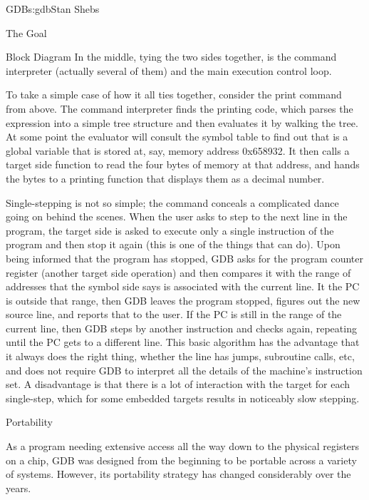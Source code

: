 \begin{aosachapter}{GDB}{s:gdb}{Stan Shebs}
\begin{aosasect1}{The Goal}
\begin{aosasect1}{Block Diagram}
In the middle, tying the two sides together, is the command
interpreter (actually several of them) and the main execution control
loop.

To take a simple case of how it all ties together, consider the print
command from above.  The command interpreter finds the printing code,
which parses the expression into a simple tree structure and then
evaluates it by walking the tree.  At some point the evaluator will
consult the symbol table to find out that  is a
global variable that is stored at, say, memory address 0x658932.  It
then calls a target side function to read the four bytes of memory at
that address, and hands the bytes to a printing function that displays
them as a decimal number.

Single-stepping is not so simple; the command  conceals a
complicated dance going on behind the scenes.  When the user asks to
step to the next line in the program, the target side is asked to
execute only a single instruction of the program and then stop it
again (this is one of the things that  can do).  Upon being
informed that the program has stopped, GDB asks for the program
counter register (another target side operation) and then compares it
with the range of addresses that the symbol side says is associated
with the current line.  It the PC is outside that range, then GDB
leaves the program stopped, figures out the new source line, and
reports that to the user.  If the PC is still in the range of the
current line, then GDB steps by another instruction and checks again,
repeating until the PC gets to a different line.  This basic algorithm
has the advantage that it always does the right thing, whether the
line has jumps, subroutine calls, etc, and does not require GDB to
interpret all the details of the machine's instruction set.  A
disadvantage is that there is a lot of interaction with the target for
each single-step, which for some embedded targets results in
noticeably slow stepping.

\end{aosasect1}

\begin{aosasect1}{Portability}

As a program needing extensive access all the way down to the physical
registers on a chip, GDB was designed from the beginning to be
portable across a variety of systems.  However, its portability
strategy has changed considerably over the years.


\end{aosasect1}
\end{aosasect1}
\end{aosachapter}
